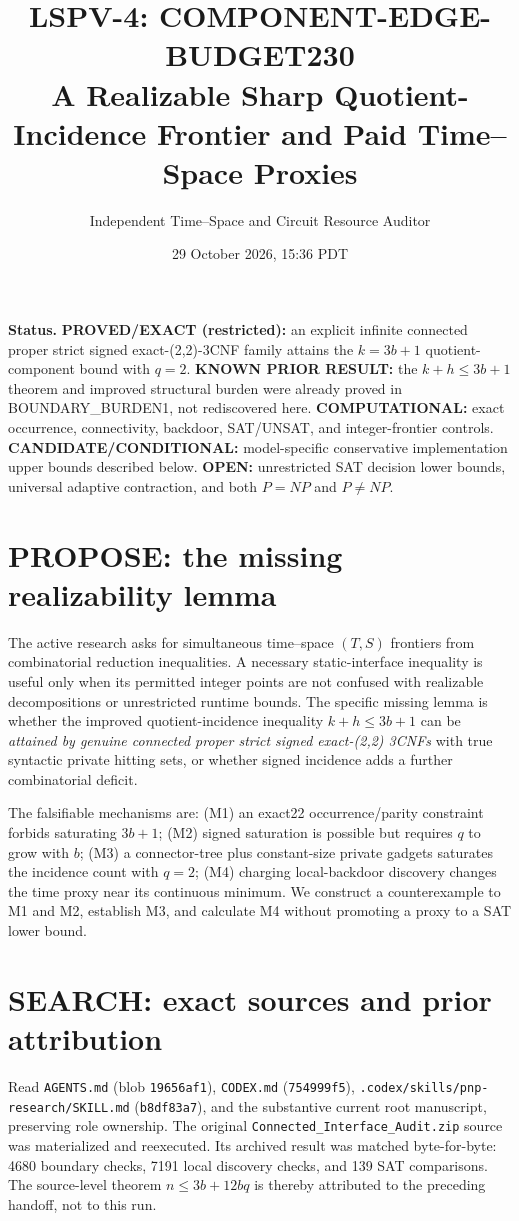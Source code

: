 \documentclass[11pt]{article}
\title{LSPV-4: COMPONENT-EDGE-BUDGET230\\\large A Realizable Sharp Quotient-Incidence Frontier and Paid Time--Space Proxies}
\author{Independent Time--Space and Circuit Resource Auditor}
\date{29 October 2026, 15:36 PDT}
\begin{document}
\maketitle
\noindent\textbf{Status.} \textbf{PROVED/EXACT (restricted):} an explicit infinite connected proper strict signed exact-(2,2)-3CNF family attains the $k=3b+1$ quotient-component bound with $q=2$. \textbf{KNOWN PRIOR RESULT:} the $k+h\le 3b+1$ theorem and improved structural burden were already proved in BOUNDARY\_BURDEN1, not rediscovered here. \textbf{COMPUTATIONAL:} exact occurrence, connectivity, backdoor, SAT/UNSAT, and integer-frontier controls. \textbf{CANDIDATE/CONDITIONAL:} model-specific conservative implementation upper bounds described below. \textbf{OPEN:} unrestricted SAT decision lower bounds, universal adaptive contraction, and both $P=NP$ and $P\ne NP$.

\section{PROPOSE: the missing realizability lemma}
The active research asks for simultaneous time--space $(T,S)$ frontiers from combinatorial reduction inequalities. A necessary static-interface inequality is useful only when its permitted integer points are not confused with realizable decompositions or unrestricted runtime bounds. The specific missing lemma is whether the improved quotient-incidence inequality $k+h\le3b+1$ can be \emph{attained by genuine connected proper strict signed exact-(2,2) 3CNFs} with true syntactic private hitting sets, or whether signed incidence adds a further combinatorial deficit.

The falsifiable mechanisms are: (M1) an exact22 occurrence/parity constraint forbids saturating $3b+1$; (M2) signed saturation is possible but requires $q$ to grow with $b$; (M3) a connector-tree plus constant-size private gadgets saturates the incidence count with $q=2$; (M4) charging local-backdoor discovery changes the time proxy near its continuous minimum. We construct a counterexample to M1 and M2, establish M3, and calculate M4 without promoting a proxy to a SAT lower bound.

\section{SEARCH: exact sources and prior attribution}
Read \texttt{AGENTS.md} (blob \texttt{19656af1}), \texttt{CODEX.md} (\texttt{754999f5}), \texttt{.codex/skills/pnp-research/SKILL.md} (\texttt{b8df83a7}), and the substantive current root manuscript, preserving role ownership. The original \texttt{Connected\_Interface\_Audit.zip} source was materialized and reexecuted. Its archived result was matched byte-for-byte: 4680 boundary checks, 7191 local discovery checks, and 139 SAT comparisons. The source-level theorem $n\le3b+12bq$ is thereby attributed to the preceding handoff, not to this run.
\end{document}
